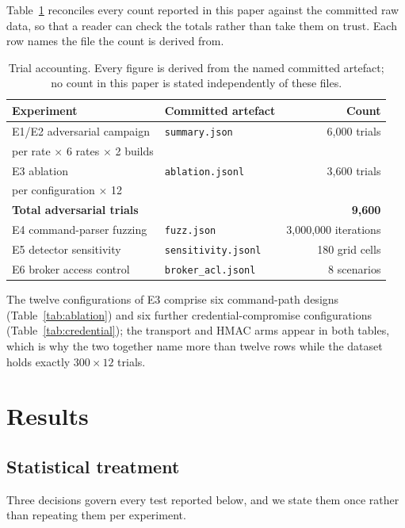 Table~\ref{tab:accounting} reconciles every count reported in this paper against the committed
raw data, so that a reader can check the totals rather than take them on trust. Each row names
the file the count is derived from.

\begin{table}[htbp]
\centering\small
\caption{Trial accounting. Every figure is derived from the named committed artefact; no count
in this paper is stated independently of these files.}
\label{tab:accounting}
\begin{tabular}{@{}llr@{}}
\toprule
Experiment & Committed artefact & Count \\
\midrule
E1/E2 adversarial campaign & \texttt{summary.json} & 6{,}000 trials \\
\quad 500 per rate $\times$ 6 rates $\times$ 2 builds & & \\
E3 ablation & \texttt{ablation.jsonl} & 3{,}600 trials \\
\quad 300 per configuration $\times$ 12 & & \\
\midrule
\textbf{Total adversarial trials} & & \textbf{9{,}600} \\
\midrule
E4 command-parser fuzzing & \texttt{fuzz.json} & 3{,}000{,}000 iterations \\
E5 detector sensitivity & \texttt{sensitivity.jsonl} & 180 grid cells \\
E6 broker access control & \texttt{broker\_acl.jsonl} & 8 scenarios \\
\bottomrule
\end{tabular}
\end{table}

The twelve configurations of E3 comprise six command-path designs (Table~\ref{tab:ablation})
and six further credential-compromise configurations (Table~\ref{tab:credential}); the
transport and HMAC arms appear in both tables, which is why the two together name more than
twelve rows while the dataset holds exactly $300 \times 12$ trials.

\section{Results}\label{sec:results}

\subsection{Statistical treatment}\label{sec:stats}

Three decisions govern every test reported below, and we state them once rather than repeating
them per experiment.

